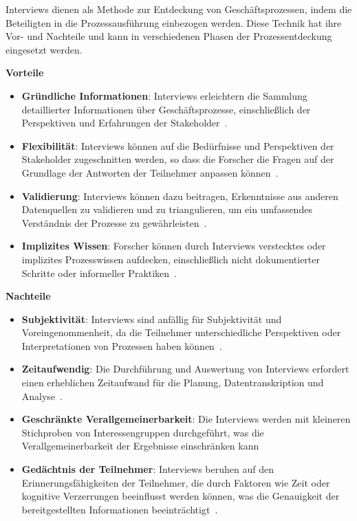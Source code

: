 Interviews dienen als Methode zur Entdeckung von Geschäftsprozessen, indem die Beteiligten in die Prozessausführung einbezogen werden. Diese Technik hat ihre Vor- und Nachteile und kann in verschiedenen Phasen der Prozessentdeckung eingesetzt werden.

\textbf{Vorteile}

\begin{itemize}
    \item \textbf{Gründliche Informationen}: Interviews erleichtern die Sammlung detaillierter Informationen über Geschäftsprozesse, einschließlich der Perspektiven und Erfahrungen der Stakeholder~\cite{Dumas2013}.
    \item \textbf{Flexibilität}: Interviews können auf die Bedürfnisse und Perspektiven der Stakeholder zugeschnitten werden, so dass die Forscher die Fragen auf der Grundlage der Antworten der Teilnehmer anpassen können~\cite{Seidman2006}.
    \item \textbf{Validierung}: Interviews können dazu beitragen, Erkenntnisse aus anderen Datenquellen zu validieren und zu triangulieren, um ein umfassendes Verständnis der Prozesse zu gewährleisten~\cite{Denzin1978}.
    \item \textbf{Implizites Wissen}: Forscher können durch Interviews verstecktes oder implizites Prozesswissen aufdecken, einschließlich nicht dokumentierter Schritte oder informeller Praktiken~\cite{Dumas2013}.
\end{itemize}

\textbf{Nachteile}

\begin{itemize}
    \item \textbf{Subjektivität}: Interviews sind anfällig für Subjektivität und Voreingenommenheit, da die Teilnehmer unterschiedliche Perspektiven oder Interpretationen von Prozessen haben können~\cite{Seidman2006}.
    \item \textbf{Zeitaufwendig}: Die Durchführung und Auswertung von Interviews erfordert einen erheblichen Zeitaufwand für die Planung, Datentranskription und Analyse~\cite{Kvale2009}.
    \item \textbf{Geschränkte Verallgemeinerbarkeit}: Die Interviews werden mit kleineren Stichproben von Interessengruppen durchgeführt, was die Verallgemeinerbarkeit der Ergebnisse einschränken kann~\cite[P. 253]{Creswell2014}
    \item \textbf{Gedächtnis der Teilnehmer}: Interviews beruhen auf den Erinnerungsfähigkeiten der Teilnehmer, die durch Faktoren wie Zeit oder kognitive Verzerrungen beeinflusst werden können, was die Genauigkeit der bereitgestellten Informationen beeinträchtigt~\cite{Kvale2009}.
\end{itemize}

